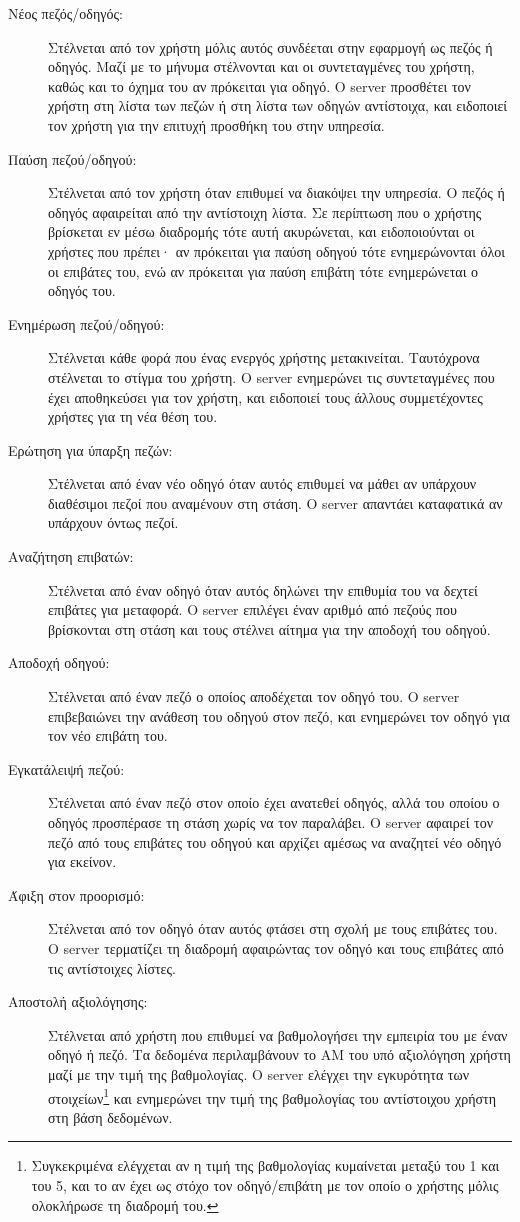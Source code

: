 \documentclass[../thesis.tex]{subfiles}
\begin{document}
\begin{description}
    \item[Νέος πεζός/οδηγός:] Στέλνεται από τον χρήστη μόλις αυτός συνδέεται στην εφαρμογή ως πεζός ή οδηγός. Μαζί με το μήνυμα στέλνονται και οι συντεταγμένες του χρήστη, καθώς και το όχημα του αν πρόκειται για οδηγό. Ο server προσθέτει τον χρήστη στη λίστα των πεζών ή στη λίστα των οδηγών αντίστοιχα, και ειδοποιεί τον χρήστη για την επιτυχή προσθήκη του στην υπηρεσία.
    \item[Παύση πεζού/οδηγού:] Στέλνεται από τον χρήστη όταν επιθυμεί να διακόψει την υπηρεσία. Ο πεζός ή οδηγός αφαιρείται από την αντίστοιχη λίστα. Σε περίπτωση που ο χρήστης βρίσκεται εν μέσω διαδρομής τότε αυτή ακυρώνεται, και ειδοποιούνται οι χρήστες που πρέπει· αν πρόκειται για παύση οδηγού τότε ενημερώνονται όλοι οι επιβάτες του, ενώ αν πρόκειται για παύση επιβάτη τότε ενημερώνεται ο οδηγός του.
    \item[Ενημέρωση πεζού/οδηγού:] Στέλνεται κάθε φορά που ένας ενεργός χρήστης μετακινείται. Ταυτόχρονα στέλνεται το στίγμα του χρήστη. Ο server ενημερώνει τις συντεταγμένες που έχει αποθηκεύσει για τον χρήστη, και ειδοποιεί τους άλλους συμμετέχοντες χρήστες για τη νέα θέση του.
    \item[Ερώτηση για ύπαρξη πεζών:] Στέλνεται από έναν νέο οδηγό όταν αυτός επιθυμεί να μάθει αν υπάρχουν διαθέσιμοι πεζοί που αναμένουν στη στάση. Ο server απαντάει καταφατικά αν υπάρχουν όντως πεζοί.
    \item[Αναζήτηση επιβατών:] Στέλνεται από έναν οδηγό όταν αυτός δηλώνει την επιθυμία του να δεχτεί επιβάτες για μεταφορά. Ο server επιλέγει έναν αριθμό από πεζούς που βρίσκονται στη στάση και τους στέλνει αίτημα για την αποδοχή του οδηγού.
    \item[Αποδοχή οδηγού:] Στέλνεται από έναν πεζό ο οποίος αποδέχεται τον οδηγό του. Ο server επιβεβαιώνει την ανάθεση του οδηγού στον πεζό, και ενημερώνει τον οδηγό για τον νέο επιβάτη του.
    \item[Εγκατάλειψή πεζού:] Στέλνεται από έναν πεζό στον οποίο έχει ανατεθεί οδηγός, αλλά του οποίου ο οδηγός προσπέρασε τη στάση χωρίς να τον παραλάβει. Ο server αφαιρεί τον πεζό από τους επιβάτες του οδηγού και αρχίζει αμέσως να αναζητεί νέο οδηγό για εκείνον.
    \item[Άφιξη στον προορισμό:] Στέλνεται από τον οδηγό όταν αυτός φτάσει στη σχολή με τους επιβάτες του. Ο server τερματίζει τη διαδρομή αφαιρώντας τον οδηγό και τους επιβάτες από τις αντίστοιχες λίστες.
    \item[Αποστολή αξιολόγησης:] Στέλνεται από χρήστη που επιθυμεί να βαθμολογήσει την εμπειρία του με έναν οδηγό ή πεζό. Τα δεδομένα περιλαμβάνουν το ΑΜ του υπό αξιολόγηση χρήστη μαζί με την τιμή της βαθμολογίας. Ο server ελέγχει την εγκυρότητα των στοιχείων\footnote{Συγκεκριμένα ελέγχεται αν η τιμή της βαθμολογίας κυμαίνεται μεταξύ του 1 και του 5, και το αν έχει ως στόχο τον οδηγό/επιβάτη με τον οποίο ο χρήστης μόλις ολοκλήρωσε τη διαδρομή του.} και ενημερώνει την τιμή της βαθμολογίας του αντίστοιχου χρήστη στη βάση δεδομένων.

\end{description}
\end{document}
